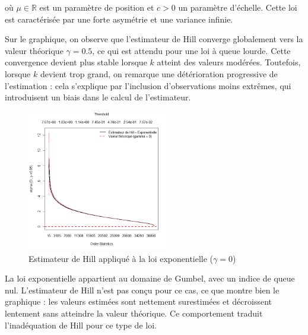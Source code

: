 \documentclass{article}
\theoremstyle{plain}
\theoremstyle{definition}
\theoremstyle{plain}
\begin{document}
où \(\mu \in \mathbb{R}\) est un paramètre de position et \(c > 0\) un paramètre d’échelle. Cette loi est caractérisée par une forte asymétrie et une variance infinie.

Sur le graphique, on observe que l’estimateur de Hill converge globalement vers la valeur théorique \(\gamma = 0.5\), ce qui est attendu pour une loi à queue lourde. Cette convergence devient plus stable lorsque \(k\) atteint des valeurs modérées. Toutefois, lorsque \(k\) devient trop grand, on remarque une détérioration progressive de l’estimation : cela s'explique par l’inclusion d’observations moins extrêmes, qui introduisent un biais dans le calcul de l’estimateur.
\begin{figure}[H]
    \centering
    \includegraphics[width=0.55\textwidth]{./Evolution des estimateurs/hill/estimateur_hill_exponentielle.png}
    \caption{Estimateur de Hill appliqué à la loi exponentielle ($\gamma = 0$)}
\end{figure}
La loi exponentielle appartient au domaine de Gumbel, avec un indice de queue nul. L’estimateur de Hill n’est pas conçu pour ce cas, ce que montre bien le graphique : les valeurs estimées sont nettement surestimées et décroissent lentement sans atteindre la valeur théorique. Ce comportement traduit l’inadéquation de Hill pour ce type de loi.
\end{document}
